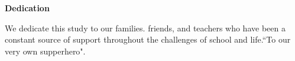\begin{center}
	\textbf{Dedication}
\end{center}

We dedicate this study to our families. friends, and teachers who have been a constant source of support throughout the challenges of school and life.``To our very own supperhero".